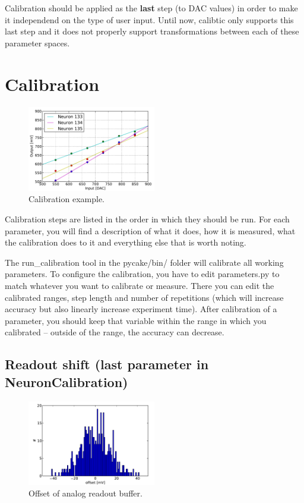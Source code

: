 \documentclass[12pt,a4paper,bibliography=totocnumbered,listof=totocnumbered, DIV12]{scrartcl}
\begin{document}
Calibration should be applied as the \textbf{last} step (to DAC values) in order to make it independend on the type of user input.
Until now, calibtic only supports this last step and it does not properly support transformations between each of these parameter spaces.

\section{Calibration}

\begin{figure}
  \centering
  \includegraphics[width=0.5\textwidth]{figures/calib_example_lines}
  \caption{Calibration example.}
  \label{fig:calibration_example}
\end{figure}

Calibration steps are listed in the order in which they should be run.
For each parameter, you will find a description of what it does, how it is measured, what the calibration does to it and everything else that is worth noting.

The run\_calibration tool in the pycake/bin/ folder will calibrate all working parameters.
To configure the calibration, you have to edit parameters.py to match whatever you want to calibrate or measure.
There you can edit the calibrated ranges, step length and number of repetitions (which will increase accuracy but also linearly increase experiment time).
After calibration of a parameter, you should keep that variable within the range in which you calibrated -- outside of the range, the accuracy can decrease.

\subsection{Readout shift (last parameter in NeuronCalibration)}

\begin{figure}
  \centering
  \includegraphics[width=0.5\textwidth]{figures/analog_readout_offset}
  \caption{Offset of analog readout buffer.}
  \label{fig:offset_analog}
\end{figure}
\end{document}
